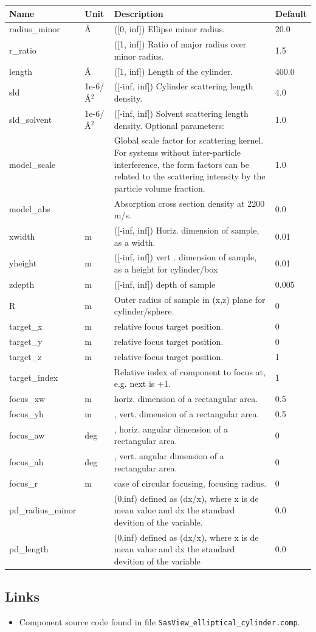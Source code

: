 \begin{longtable}{p{}p{}p{}p{}}
\toprule
\textbf{Name} & \textbf{Unit} & \textbf{Description} & \textbf{Default} \\
\midrule
\endhead
radius\_minor & \AA{} & ([0, inf]) Ellipse minor radius. & 20.0 \\
r\_ratio &  & ([1, inf]) Ratio of major radius over minor radius. & 1.5 \\
length & \AA{} & ([1, inf]) Length of the cylinder. & 400.0 \\
sld & 1e-6/\AA{}$^{2}$ & ([-inf, inf]) Cylinder scattering length density. & 4.0 \\
sld\_solvent & 1e-6/\AA{}$^{2}$ & ([-inf, inf]) Solvent scattering length density. Optional parameters: & 1.0 \\
model\_scale &   & Global scale factor for scattering kernel. For systems without inter-particle interference, the form factors can be related to the scattering intensity by the particle volume fraction. & 1.0 \\
model\_abs &   & Absorption cross section density at 2200 m/s. & 0.0 \\
xwidth & m & ([-inf, inf]) Horiz. dimension of sample, as a width. & 0.01 \\
yheight & m & ([-inf, inf]) vert . dimension of sample, as a height for cylinder/box & 0.01 \\
zdepth & m & ([-inf, inf]) depth of sample & 0.005 \\
R & m & Outer radius of sample in (x,z) plane for cylinder/sphere. & 0 \\
target\_x & m & relative focus target position. & 0 \\
target\_y & m & relative focus target position. & 0 \\
target\_z & m & relative focus target position. & 1 \\
target\_index &   & Relative index of component to focus at, e.g. next is +1. & 1 \\
focus\_xw & m & horiz. dimension of a rectangular area. & 0.5 \\
focus\_yh & m & , vert. dimension of a rectangular area. & 0.5 \\
focus\_aw & deg & , horiz. angular dimension of a rectangular area. & 0 \\
focus\_ah & deg & , vert. angular dimension of a rectangular area. & 0 \\
focus\_r & m & case of circular focusing, focusing radius. & 0 \\
pd\_radius\_minor &  & (0,inf) defined as (dx/x), where x is de mean value and dx the standard devition of the variable. & 0.0 \\
pd\_length &  & (0,inf) defined as (dx/x), where x is de mean value and dx the standard devition of the variable & 0.0 \\
\bottomrule
\end{longtable}

\subsection*{Links}
\begin{itemize}
  \item Component source code found in file \texttt{SasView\_elliptical\_cylinder.comp}.
\end{itemize}
